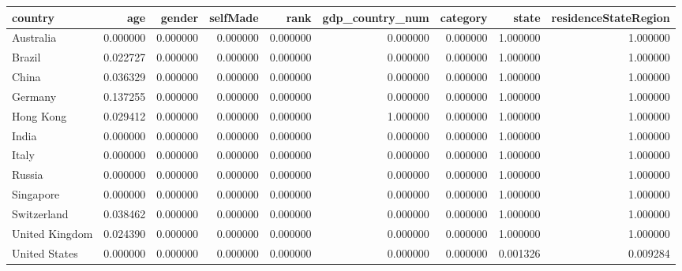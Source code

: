 \begin{tabular}{lrrrrrrrr}
\toprule
country & age & gender & selfMade & rank & gdp\_country\_num & category & state & residenceStateRegion \\
\midrule
Australia & 0.000000 & 0.000000 & 0.000000 & 0.000000 & 0.000000 & 0.000000 & 1.000000 & 1.000000 \\
Brazil & 0.022727 & 0.000000 & 0.000000 & 0.000000 & 0.000000 & 0.000000 & 1.000000 & 1.000000 \\
China & 0.036329 & 0.000000 & 0.000000 & 0.000000 & 0.000000 & 0.000000 & 1.000000 & 1.000000 \\
Germany & 0.137255 & 0.000000 & 0.000000 & 0.000000 & 0.000000 & 0.000000 & 1.000000 & 1.000000 \\
Hong Kong & 0.029412 & 0.000000 & 0.000000 & 0.000000 & 1.000000 & 0.000000 & 1.000000 & 1.000000 \\
India & 0.000000 & 0.000000 & 0.000000 & 0.000000 & 0.000000 & 0.000000 & 1.000000 & 1.000000 \\
Italy & 0.000000 & 0.000000 & 0.000000 & 0.000000 & 0.000000 & 0.000000 & 1.000000 & 1.000000 \\
Russia & 0.000000 & 0.000000 & 0.000000 & 0.000000 & 0.000000 & 0.000000 & 1.000000 & 1.000000 \\
Singapore & 0.000000 & 0.000000 & 0.000000 & 0.000000 & 0.000000 & 0.000000 & 1.000000 & 1.000000 \\
Switzerland & 0.038462 & 0.000000 & 0.000000 & 0.000000 & 0.000000 & 0.000000 & 1.000000 & 1.000000 \\
United Kingdom & 0.024390 & 0.000000 & 0.000000 & 0.000000 & 0.000000 & 0.000000 & 1.000000 & 1.000000 \\
United States & 0.000000 & 0.000000 & 0.000000 & 0.000000 & 0.000000 & 0.000000 & 0.001326 & 0.009284 \\
\bottomrule
\end{tabular}
